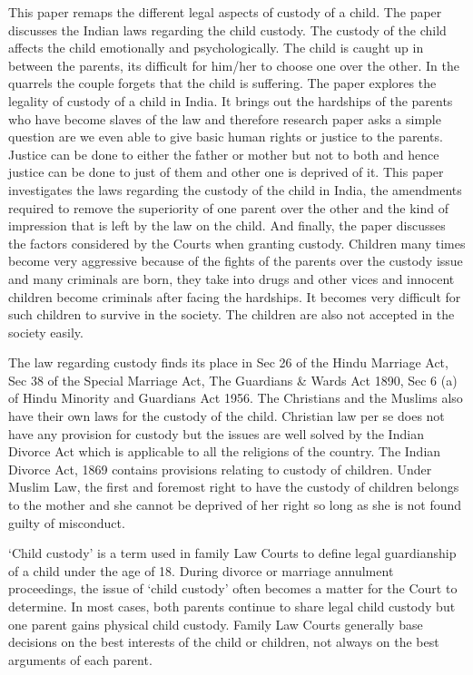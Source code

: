 \begin{multicols}{2}
\noi
This paper remaps the different legal aspects of custody of a child. The paper discusses the Indian
laws regarding the child custody. The custody of the child affects the child emotionally and
psychologically. The child is caught up in between the parents, its difficult for him/her to choose
one over the other. In the quarrels the couple forgets that the child is suffering. The paper explores
the legality of custody of a child in India. It brings out the hardships of the parents who have
become slaves of the law and therefore research paper asks a simple question are we even able to
give basic human rights or justice to the parents. Justice can be done to either the father or mother
but not to both and hence justice can be done to just of them and other one is deprived of it. This
paper investigates the laws regarding the custody of the child in India, the amendments required
to remove the superiority of one parent over the other and the kind of impression that is left by
the law on the child. And finally, the paper discusses the factors considered by the Courts when
granting custody. Children many times become very aggressive because of the fights of the
parents over the custody issue and many criminals are born, they take into drugs and other vices
and innocent children become criminals after facing the hardships. It becomes very difficult for
such children to survive in the society. The children are also not accepted in the society easily.

\vspace{-.1cm}

\noi
The law regarding custody finds its place in Sec 26 of the Hindu Marriage Act, Sec 38 of the
Special Marriage Act, The Guardians \& Wards Act 1890, Sec 6 (a) of Hindu Minority and
Guardians Act 1956. The Christians and the Muslims also have their own laws for the custody of
the child. Christian law per se does not have any provision for custody but the issues are well
solved by the Indian Divorce Act which is applicable to all the religions of the country. The Indian
Divorce Act, 1869 contains provisions relating to custody of children. Under Muslim Law, the
first and foremost right to have the custody of children belongs to the mother and she cannot be
deprived of her right so long as she is not found guilty of misconduct.

\vspace{-.1cm}

\noi
‘Child custody’ is a term used in family Law Courts to define legal guardianship of a child under
the age of 18. During divorce or marriage annulment proceedings, the issue of ‘child custody’ often becomes a matter for the Court to determine. In most cases, both parents continue to share
legal child custody but one parent gains physical child custody. Family Law Courts generally
base decisions on the best interests of the child or children, not always on the best arguments of
each parent.


\end{multicols}
